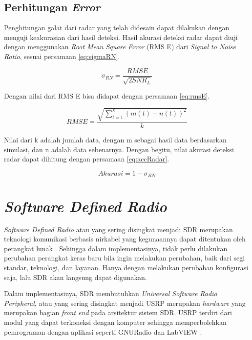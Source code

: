 \subsection{Perhitungan \textit{Error}}
Penghitungan galat dari radar yang telah didesain dapat dilakukan dengan menguji keakurasian dari hasil deteksi. Hasil akurasi deteksi radar dapat diuji dengan menggunakan \textit{Root Mean Square Error} (RMS E) dari \textit{Signal to Noise Ratio}, sesuai persamaan \ref{eq:sigmaRN}.

\begin{equation}
	\sigma_{RN} = \frac{RMS E}{\sqrt{2 SNR_{L}}}
	\label{eq:sigmaRN}
\end{equation}

Dengan nilai dari RMS E bisa didapat dengan persamaan \ref{eq:rmsE}.

\begin{equation}
	RMS E = \frac{\sqrt{\sum_{t = 1}^{k} (m(t)-n(t))^2}}{k}
	\label{eq:rmsE}
\end{equation}

Nilai dari k adalah jumlah data, dengan m sebagai hasil data berdasarkan simulasi, dan n adalah data sebenarnya. Dengan begitu, nilai akurasi deteksi radar dapat dihitung dengan persamaan \ref{eq:accRadar}.

\begin{equation}
	Akurasi = 1 - \sigma_{RN}
	\label{eq:accRadar}
\end{equation}

\section{\textit{Software Defined Radio}}
\textit{Software Defined Radio} atau yang sering disingkat menjadi SDR merupakan teknologi komunikasi berbasis nirkabel yang kegunaannya dapat ditentukan oleh perangkat lunak \cite{Anisah2018}. Sehingga dalam implementasinya, tidak perlu dilakukan perubahan perangkat keras baru bila ingin melakukan perubahan, baik dari segi standar, teknologi, dan layanan. Hanya dengan melakukan perubahan konfigurasi saja, lalu SDR akan langsung dapat digunakan. 

Dalam implementasinya, SDR membutuhkan \textit{Universal Software Radio Peripheral}, atau yang sering disingkat menjadi USRP merupakan \textit{hardware} yang merupakan bagian \textit{front end} pada arsitektur sistem SDR. USRP terdiri dari modul yang dapat terkoneksi dengan komputer sehingga memperbolehkan pemrograman dengan aplikasi seperti GNURadio dan LabVIEW \cite{Gulo2023}. 

